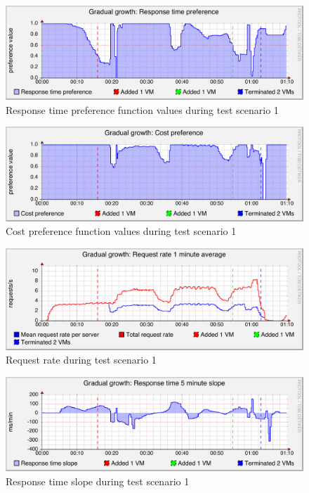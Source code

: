 \documentclass[english]{tktltiki2}
\theoremstyle{definition}
\theoremstyle{remark}
\begin{document}
\begin{figure}[htbp]
	\includegraphics[width=\textwidth]{images/responsetimepreferencegraph-test21}
	\caption{Response time preference function values during test scenario 1}
	\label{fig:responseTimePreferenceScenario1}
\end{figure}

\begin{figure}[htbp]
	\includegraphics[width=\textwidth]{images/costpreferencegraph-test21}
	\caption{Cost preference function values during test scenario 1}
	\label{fig:costPreferenceScenario1}
\end{figure}

\begin{figure}[htbp]
	\includegraphics[width=\textwidth]{images/requestrategraph-test21}
	\caption{Request rate during test scenario 1}
	\label{fig:requestRateScenario1}
\end{figure}

\begin{figure}[htbp]
	\includegraphics[width=\textwidth]{images/responsetimeslopegraph-test21}
	\caption{Response time slope during test scenario 1}
	\label{fig:responseTimeSlopeScenario1}
\end{figure}
\end{document}

